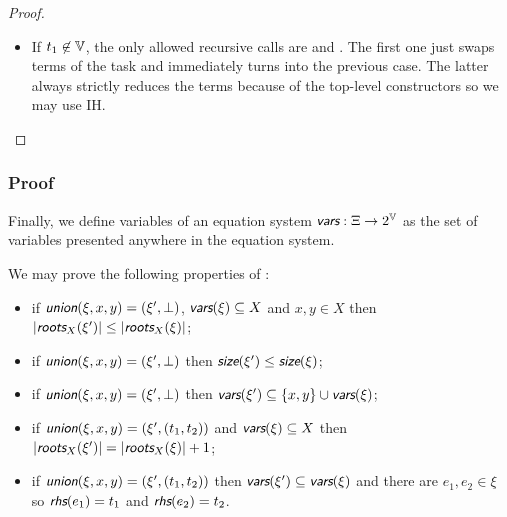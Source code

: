 \begin{proof}
\begin{itemize}
\begin{itemize}
\begin{enumerate}
\begin{equation*}
\begin{array}{r@{{}={}}l}
                        & \underline{\size(\xi_1) + \size(t)} + \size(t_y) \\
                        & \size(\xi_2) + \underline{\size(t_x) + \size(t_y)} \\
                        & \size(\xi_2) + \cost(t_x, t_y) + \size(t).
                    \end{array}
                \end{equation*}
                \item Let's consider the possible recursive calls from $(\xi_2, t_x, t_y)$. Since $t_x, t_y \not\in \V$, it's only . We may see that any  recursive call strictly reduces the terms \cost because of the top-level constructors so we may use IH.
            \end{enumerate}
        \end{itemize}
        \item If $t_1 \not\in \mathbb{V}$, the only allowed recursive calls are  and . The first one just swaps terms of the task and immediately turns into the previous case. The latter always strictly reduces the terms \cost because of the top-level constructors so we may use IH.
    \end{itemize}
\end{proof}


\subsubsection{Proof}

Finally, we define variables of an equation system $\vars : \Xi \rightarrow 2^\V$ as the set of variables presented anywhere in the equation system.

We may prove the following properties of \union{}:
\begin{itemize}
    \item if $\union(\xi, x, y) = (\xi', \bot)$, $\vars(\xi) \subseteq X$ and $x, y \in X$ then $|\roots_X(\xi')| \le |\roots_X(\xi)|$;
    \item if $\union(\xi, x, y) = (\xi', \bot)$ then $\size(\xi') \le \size(\xi)$;
    \item if $\union(\xi, x, y) = (\xi', \bot)$ then $\vars(\xi') \subseteq \{ x, y \} \cup \vars(\xi)$;
    \item if $\union(\xi, x, y) = (\xi', (t_1, t_2))$ and $\vars(\xi) \subseteq X$ then $|\roots_X(\xi')| = |\roots_X(\xi)| + 1$;
    \item if $\union(\xi, x, y) = (\xi', (t_1, t_2))$ then $\vars(\xi') \subseteq \vars(\xi)$ and there are $e_1, e_2 \in \xi$ so $\rhs(e_1) = t_1$ and $\rhs(e_2) = t_2$.
\end{itemize}

